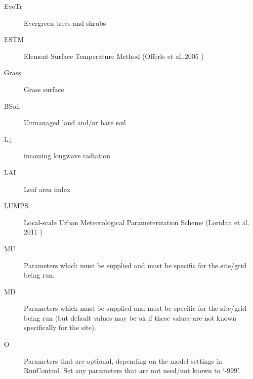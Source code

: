 \documentclass[letterpaper,10pt,english]{sphinxmanual}
\begin{document}
\begin{description}
\item[{EveTr}] \leavevmode{}\label{\detokenize{notation:term-evetr}}
Evergreen trees and shrubs

\item[{ESTM}] \leavevmode{}\label{\detokenize{notation:term-estm}}
Element Surface Temperature Method (Offerle et al.,2005 \label{\detokenize{notation:id1}}{\hyperref[\detokenize{references:oaf2005}]{\sphinxcrossref{{[}Oaf2005{]}}}})

\item[{Grass}] \leavevmode{}\label{\detokenize{notation:term-grass}}
Grass surface

\item[{BSoil}] \leavevmode{}\label{\detokenize{notation:term-bsoil}}
Unmanaged land and/or bare soil

\item[{L↓}] \leavevmode{}\label{\detokenize{notation:term-l}}
incoming longwave radiation

\item[{LAI}] \leavevmode{}\label{\detokenize{notation:term-lai}}
Leaf area index

\item[{LUMPS}] \leavevmode{}\label{\detokenize{notation:term-lumps}}
Local-scale Urban Meteorological Parameterization Scheme
(Loridan   et al. 2011 \label{\detokenize{notation:id2}}{\hyperref[\detokenize{references:l2011}]{\sphinxcrossref{{[}L2011{]}}}})

\item[{MU}] \leavevmode{}\label{\detokenize{notation:term-mu}}
Parameters which must be supplied and must be specific for the site/grid being run.

\item[{MD}] \leavevmode{}\label{\detokenize{notation:term-md}}
Parameters which must be supplied and must be specific for the site/grid being run (but default values may be ok if these values are not known specifically for the site).

\item[{O}] \leavevmode{}\label{\detokenize{notation:term-o}}
Parameters that are optional, depending on the model settings in RunControl. Set any parameters that are not used/not known to ‘-999’.


\end{description}
\end{document}
